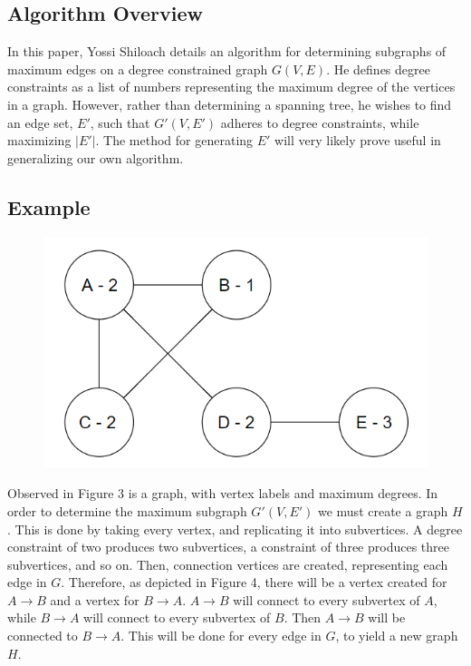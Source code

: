 \documentclass{article}
\begin{document}
	\subsection{Algorithm Overview}
	In this paper, Yossi Shiloach details an algorithm for determining subgraphs of maximum edges on a degree constrained graph $G(V,E)$. He defines
	degree constraints as a list of numbers representing the maximum degree of the vertices in a graph. However, rather than determining a spanning tree, he wishes to find an edge set, $E'$, such that $G'(V,E')$ adheres to degree constraints, while maximizing $|E'|$. The method for generating $E'$ will very likely  prove useful in generalizing our own algorithm.
	\subsection{Example}
	
		\begin{figure}[H]
			\caption{}
			\includegraphics{Figure3}
		\end{figure}
	
	Observed in Figure 3 is a graph, with vertex labels and maximum degrees. In order to determine the maximum subgraph $G'(V,E')$ we must create a graph $H$. This is done by taking every vertex, and replicating it into subvertices. A degree constraint of two produces two subvertices, a constraint of three produces three subvertices, and so on. Then, connection vertices are created, representing each edge in $G$. Therefore, as depicted in Figure 4, there will be a vertex created for $A\rightarrow B$ and a vertex for $B\rightarrow A$. $A\rightarrow B$ will connect to every subvertex of $A$, while  $B\rightarrow A$ will connect to every subvertex of $B$. Then $A\rightarrow B$ will be connected to  $B\rightarrow A$. This will be done for every edge in $G$, to yield a new graph $H$.
	
\end{document}
